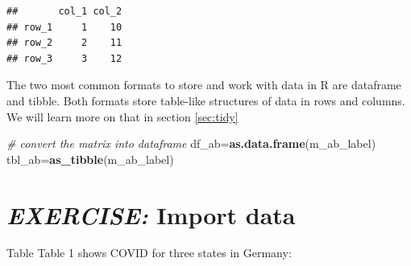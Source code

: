 \documentclass[
  12pt,
  oneside]{book}
\newenvironment{Shaded}{\begin{snugshade}}{\end{snugshade}}
\newcommand{\CommentTok}[1]{\textcolor[rgb]{0.56,0.35,0.01}{\textit{#1}}}
\newcommand{\FunctionTok}[1]{\textcolor[rgb]{0.13,0.29,0.53}{\textbf{#1}}}
\newcommand{\NormalTok}[1]{#1}
\newcommand{\OtherTok}[1]{\textcolor[rgb]{0.56,0.35,0.01}{#1}}
\begin{document}
\begin{verbatim}
##       col_1 col_2
## row_1     1    10
## row_2     2    11
## row_3     3    12
\end{verbatim}

The two most common formats to store and work with data in R are dataframe and tibble. Both formats store table-like structures of data in rows and columns. We will learn more on that in section \ref{sec:tidy}

\begin{Shaded}
\begin{Highlighting}[]
\CommentTok{\# convert the matrix into dataframe}
\NormalTok{df\_ab}\OtherTok{=}\FunctionTok{as.data.frame}\NormalTok{(m\_ab\_label)}
\NormalTok{tbl\_ab}\OtherTok{=}\FunctionTok{as\_tibble}\NormalTok{(m\_ab\_label)}
\end{Highlighting}
\end{Shaded}

\hypertarget{exercise-import-data}{%
\section*{\texorpdfstring{\emph{EXERCISE:} Import data}{EXERCISE: Import data}}\label{exercise-import-data}}

Table Table 1 shows COVID for three states in Germany:
\end{document}
